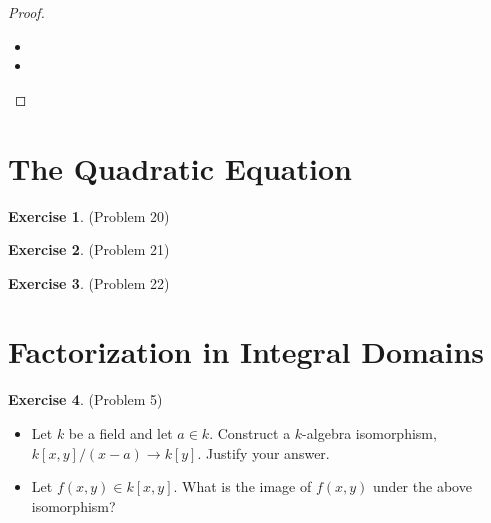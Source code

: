 \documentclass[12pt, psamsfonts]{amsart}
\theoremstyle{definition}
\newtheorem*{exer}{Exercise}
\theoremstyle{remark}
\numberwithin{equation}{section}
\begin{document}
\begin{proof}
$ $
  \begin{itemize}
    \item
    \item
  \end{itemize}
\end{proof}

\section{The Quadratic Equation}

\begin{exer}{(Problem 20)}
  \todo[inline]{
  }
\end{exer}

\begin{exer}{(Problem 21)}
  \todo[inline]{
  }
\end{exer}

\begin{exer}{(Problem 22)}
  \todo[inline]{
  }
\end{exer}

\section{Factorization in Integral Domains}

\begin{exer}{(Problem 5)}
  $ $
  \begin{itemize}
    \item
      Let $k$ be a field and let $a \in k$.
      Construct a $k$-algebra isomorphism, $k[x, y] / (x - a) \rightarrow k[y]$.
      Justify your answer.
    \item
      Let $f(x, y) \in k[x, y]$.
      What is the image of $f(x, y)$ under the above isomorphism?
  \end{itemize}
\end{exer}
\end{document}
